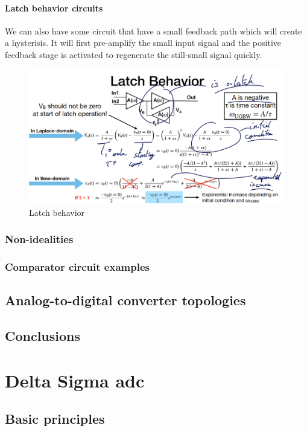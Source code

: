 \documentclass{report}
\begin{document}
\subsubsection{Latch behavior circuits}

We can also have some circuit that have a small feedback path which will create a hysterisis. It will first pre-amplify the small input signal and the positive feedback stage is activated to regenerate the still-small signal quickly.

\begin{figure}[H]
    \centering
    \includegraphics[width=0.75\linewidth]{latch_behavior.png}
    \caption{Latch behavior}
    \label{fig:enter-label}
\end{figure}


\subsection{Non-idealities}
\subsection{Comparator circuit examples}

\section{Analog-to-digital converter topologies}
\section{Conclusions}

\chapter{Delta Sigma \gls{adc}}

\section{Basic principles}
\end{document}
